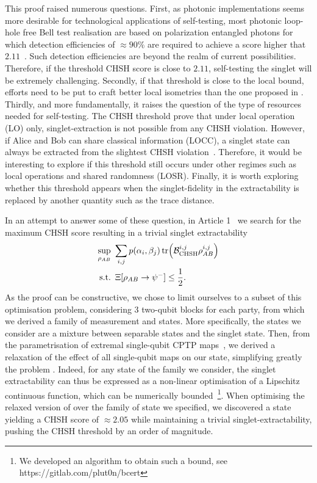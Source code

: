 \medbreak

This proof raised numerous questions. 
First, as photonic implementations seems more desirable for technological applications of self-testing, most photonic loop-hole free Bell test realisation are based on polarization entangled photons for which detection efficiencies of $\approx 90\%$ are required to achieve a score higher that $2.11$~\cite{Vivoli2015b}. 
Such detection efficiencies are beyond the realm of current possibilities. 
Therefore, if the threshold CHSH score is close to $2.11$, self-testing the singlet will be extremely challenging.
Secondly, if that threshold is close to the local bound, efforts need to be put to craft better local isometries than the one proposed in \cite{Kaniewski2016}.
Thirdly, and more fundamentally, it raises the question of the type of resources needed for self-testing.
The CHSH threshold prove that under local operation (LO) only, singlet-extraction is not possible from any CHSH violation.
However, if Alice and Bob can share classical information (LOCC), a singlet state can always be extracted from the slightest CHSH violation~\cite{Bardyn2009}. 
Therefore, it would be interesting to explore if this threshold still occurs under other regimes such as local operations and shared randomness (LOSR).
Finally, it is worth exploring whether this threshold appears when the singlet-fidelity in the extractability is replaced by another quantity such as the trace distance. 

\medbreak

In an attempt to answer some of these question, in Article 1~\cite{Valcarce2020} we search for the maximum CHSH score resulting in a trivial singlet extractability
\begin{equation}
	\begin{split}
		\sup_{\rho_{AB}}\ &\sum_{i,j} p(\alpha_i,\beta_j) \tr (\mathcal{B}_\text{CHSH}^{i,j} \rho_{AB}^{i,j})\\
\textnormal{s.t.}\ &\,\Xi[\rho_{AB}\rightarrow \psi^-] \leq \frac{1}{2}.
	\end{split}
	\label{eq:CHSH_threshold}
\end{equation}
As the proof can be constructive, we chose to limit ourselves to a subset of this optimisation problem, considering 3 two-qubit blocks for each party, from which we derived a family of measurement and states.
More specifically, the states we consider are a mixture between separable states and the singlet state.
Then, from the parametrisation of extremal single-qubit CPTP maps~\cite{Verstraete2002}, we derived a relaxation of the effect of all single-qubit maps on our state, simplifying greatly the problem .
Indeed, for any state of the family we consider, the singlet extractability can thus be expressed as a non-linear optimisation of a Lipschitz continuous function, which can be numerically bounded~\footnote{We developed an algorithm to obtain such a bound, see https://gitlab.com/plut0n/bcert}.
When optimising the relaxed version of  over the family of state we specified, we discovered a state yielding a CHSH score of $\approx 2.05$ while maintaining a trivial singlet-extractability, pushing the CHSH threshold by an order of magnitude.

